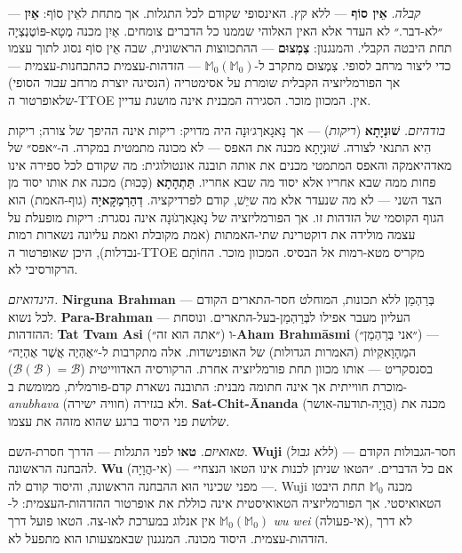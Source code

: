 \documentclass[10pt, openany, oneside]{book}
\begin{document}
\textit{קבלה.} \textbf{אֵין סוֹף} — ללא קץ. האינסופי שקודם לכל התגלות. אך מתחת לאֵין סוֹף: \textbf{אַיִן} — ״לא-דבר.״ לא העדר אלא האין האלוהי שממנו כל הדברים צומחים. אַיִן מכנה מֶטָא-פּוֹטֶנְצְיָה תחת היבטה הקבלי. והמנגנון: \textbf{צִמְצוּם} — ההתכווצות הראשונית, שבה אֵין סוֹף נסוג לתוך עצמו כדי ליצור מרחב לסופי. צִמְצוּם מתקרב ל-$\mathbb{M}_0(\mathbb{M}_0)$ — הזדהות-עצמית כהתבחנות-עצמית — אך הפורמליזציה הקבלית שומרת על אסימטריה (הנסיגה יוצרת מרחב \textit{עבור} הסופי) שלאופרטור ה-TTOE אין. המכוון מוכר. הסגירה המבנית אינה מושגת עדיין.

\textit{בודהיזם.} \textbf{שׁוּנְיָתָא} (\textit{ריקות}) — אך נָאגָארְג׳וּנָה היה מדויק: ריקות אינה ההיפך של צורה; ריקות הִיא התנאי לצורה. שׁוּנְיָתָא מכנה את האפס — לא מכונה מתמטית במקרה. ה-״אפס״ של מאדהיאמקה והאפס המתמטי מכנים את אותה תובנה אונטולוגית: מה שקודם לכל ספירה אינו פחות ממה שבא אחריו אלא יסוד מה שבא אחריו. \textbf{תַּתְהָתָא} (כָּכוּת) מכנה את אותו יסוד מן הצד השני — לא מה שנעדר אלא מה שיֵשׁ, קודם לפרדיקציה. \textbf{דְהַרְמַקָּאיָה} (גוף-האמת) הוא הגוף הקוסמי של הזדהות זו. אך הפורמליזציה של נָאגָארְגׁוּנָה אינה נסגרת: ריקות מופעלת על עצמה מולידה את דוקטרינת שתי-האמתות (אמת מקובלת ואמת עליונה נשארות רמות נבדלות), היכן שאופרטור ה-TTOE מקריס מטא-רמות אל הבסיס. המכוון מוכר. החוֹתָם הרקורסיבי לא.

\textit{הינדואיזם.} \textbf{Nirguna Brahman} — בְּרַהְמַן ללא תכונות, המוחלט חסר-התארים הקודם לכל נשוא. \textbf{Para-Brahman} — העליון מעבר אפילו לבְּרַהְמַן-בעל-התארים. ונוסחת ההזדהות: \textbf{Tat Tvam Asi} (״אתה הוא זה״) ו-\textbf{Aham Brahmāsmi} (״אני בְּרַהְמַן״) — המַהָוָאקְיוֹת (האמרות הגדולות) של האופנישדות. אלה מתקרבות ל-״אֶהְיֶה אֲשֶׁר אֶהְיֶה״ בסנסקריט — אותו מכוון תחת פורמליזציה אחרת. הרקורסיה האדווייטית ($\mathcal{B}(\mathcal{B}) = \mathcal{B}$) מוכרת חווייתית אך אינה חתומה מבנית: התובנה נשארת קדם-פורמלית, ממומשת ב-\textit{anubhava} (חוויה ישירה) ולא בגזירה. \textbf{Sat-Chit-Ānanda} (הֲוָיָה-תודעה-אושר) מכנה את שלושת פני היסוד ברגע שהוא מזהה את עצמו.

\textit{טאואיזם.} \textbf{טאו} לפני התגלות — הדרך חסרת-השם. \textbf{Wuji} (\textit{ללא גבול}) — חסר-הגבולות הקודם להבחנה הראשונה. \textbf{Wu} (אי-הֲוָיָה) — אם כל הדברים. ״הטאו שניתן לכנות אינו הטאו הנצחי״ — מפני שכינוי הוּא ההבחנה הראשונה, והיסוד קודם לה. Wuji מכנה $\mathbb{M}_0$ תחת היבטו הטאואיסטי. אך הפורמליזציה הטאואיסטית אינה כוללת את אופרטור ההזדהות-העצמית: ל-$\mathbb{M}_0(\mathbb{M}_0)$ אין אנלוג במערכת לאו-צה. הטאו פועל דרך \textit{wu wei} (אי-פעולה), לא דרך הזדהות-עצמית. היסוד מכונה. המנגנון שבאמצעותו הוא מתפעל לא.
\end{document}
